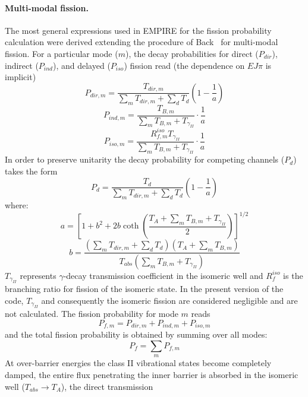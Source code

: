 \documentclass[twocolumn,amsmath,amssymb,10pt,groupedaddress,a4paper]{revtex4}
\begin{document}
\paragraph*{Multi-modal fission.}
The most general expressions used in EMPIRE for the fission probability
calculation were derived extending the procedure of Back~\cite{Back:74}
for multi-modal fission. For a particular mode ($m$), the decay probabilities
for direct ($P_{dir}$), indirect ($P_{ind}$), and delayed ($P_{iso}$)
fission read (the dependence on $EJ\pi$ is implicit)
\begin{equation}
P_{dir,m}=\frac{T_{dir,m}}{\sum_{m}T_{dir,m}+\sum_{d}T_{d}}\left(1-\frac{1}{a}\right)
\end{equation}
\begin{equation}
P_{ind,m}=\frac{T_{B,m}}{\sum_{m}T_{B,m}+T_{\gamma_{II}}}\cdot\frac{1}{a}
\end{equation}
\begin{equation}
P_{iso,m}=\frac{R_{f,m}^{iso}T_{\gamma_{II}}}{\sum_{m}T_{B,m}+T_{\gamma_{II}}}\cdot\frac{1}{a}
\end{equation}
 In order to preserve unitarity the decay probability for competing
channels ($P_{d}$) takes the form
\begin{equation}
P_{d}=\frac{T_{d}}{\sum_{m}T_{dir,m}+\sum_{d}T_{d}}\left(1-\frac{1}{a}\right)
\end{equation}
\noindent where: \[
a=\left[1+b^{2}+2b\coth\left(\frac{T_{A}+\sum_{m}T_{B,m}+T_{\gamma_{II}}}{2}\right)\right]^{1/2}\]
 \[
b=\frac{(\sum_{m}T_{dir,m}+\sum_{d}T_{d})(T_{A}+\sum_{m}T_{B,m})}{T_{abs}(\sum_{m}T_{B,m}+T_{\gamma_{II}})}\]
 $T_{\gamma_{II}}$ represents $\gamma$-decay transmission coefficient
in the isomeric well and $R_{f}^{iso}$ is the branching ratio for
fission of the isomeric state. In the present version of the code,
$T_{\gamma_{II}}$ and consequently the isomeric
fission are considered negligible and are not calculated. The fission
probability for mode $m$ reads
\begin{equation}
P_{f,m}=P_{dir,m}+P_{ind,m}+P_{iso,m}
\end{equation}
 and the total fission probability is obtained by summing over all
modes:
\begin{equation}
P_{f}=\sum_{m}P_{f,m}
\end{equation}
 At over-barrier energies the class II vibrational states become completely
damped, the entire flux penetrating the inner barrier is absorbed
in the isomeric well ($T_{abs}\rightarrow T_{A}$), the direct transmission
\end{document}
